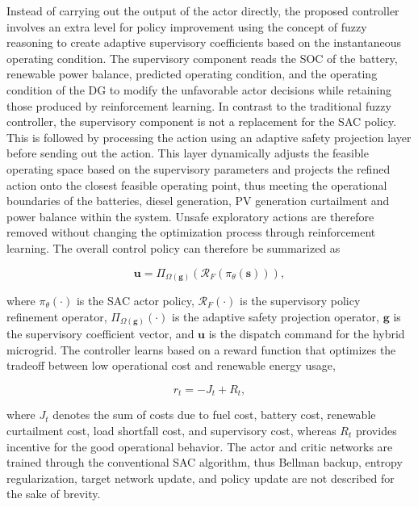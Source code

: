 \documentclass[journal]{IEEEtran}
\begin{document}
Instead of carrying out the output of the actor directly, the proposed controller involves an extra level for policy improvement using the concept of fuzzy reasoning to create adaptive supervisory coefficients based on the instantaneous operating condition. The supervisory component reads the SOC of the battery, renewable power balance, predicted operating condition, and the operating condition of the DG to modify the unfavorable actor decisions while retaining those produced by reinforcement learning. In contrast to the traditional fuzzy controller, the supervisory component is not a replacement for the SAC policy. This is followed by processing the action using an adaptive safety projection layer before sending out the action. This layer dynamically adjusts the feasible operating space based on the supervisory parameters and projects the refined action onto the closest feasible operating point, thus meeting the operational boundaries of the batteries, diesel generation, PV generation curtailment and power balance within the system. Unsafe exploratory actions are therefore removed without changing the optimization process through reinforcement learning. The overall control policy can therefore be summarized as

\begin{equation}
\boxed{
\mathbf{u}
=
\Pi_{\Omega(\mathbf{g})}
\left(
\mathcal{R}_{F}
\left(
\pi_{\theta}
(\mathbf{s})
\right)
\right),
}
\label{eq:controller}
\end{equation}

where $\pi_{\theta}(\cdot)$ is the SAC actor policy, $\mathcal{R}_{F}(\cdot)$ is the supervisory policy refinement operator, $\Pi_{\Omega(\mathbf{g})}(\cdot)$ is the adaptive safety projection operator, $\mathbf{g}$ is the supervisory coefficient vector, and $\mathbf{u}$ is the dispatch command for the hybrid microgrid. The controller learns based on a reward function that optimizes the tradeoff between low operational cost and renewable energy usage,

\begin{equation}
r_t=-J_t+R_t,
\label{eq:reward}
\end{equation}

where $J_t$ denotes the sum of costs due to fuel cost, battery cost, renewable curtailment cost, load shortfall cost, and supervisory cost, whereas $R_t$ provides incentive for the good operational behavior. The actor and critic networks are trained through the conventional SAC algorithm, thus Bellman backup, entropy regularization, target network update, and policy update are not described for the sake of brevity. 
\end{document}
